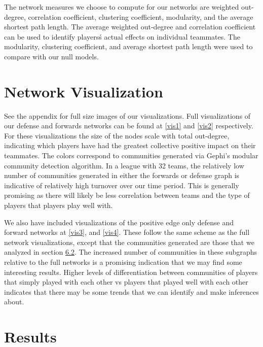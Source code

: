 \documentclass{article}
\begin{document}
The network measures we choose to compute for our networks are weighted out-degree,  correlation coefficient, clustering coefficient, modularity, and the average shortest path length. The average weighted out-degree and correlation coefficient can be used to identify players\'s actual effects on individual teammates. The modularity, clustering coefficient, and average shortest path length  were used to compare with our null models. 


\section{Network Visualization}
See the appendix for full size images of our visualizations.
Full visualizations of our defense and forwards networks can be found at \ref{vis1} and \ref{vis2} respectively.
For these visualizations the size of the nodes scale with total out-degree, indicating which players have had the greatest collective positive impact on their teammates.
The colors correspond to communities generated via Gephi's modular community detection algorithm.
In a league with 32 teams, the relatively low number of communities generated in either the forwards or defense graph is indicative of relatively high turnover over our time period.
This is generally promising as there will likely be less correlation between teams and the type of players that players play well with.

We also have included visualizations of the positive edge only defense and forward networks at \ref{vis3}, and \ref{vis4}.
These follow the same scheme as the full network visualizations, except that the communities generated are those that we analyzed in section \hyperref[sec:community]{6.2}.
The increased number of communities in these subgraphs relative to the full networks is a promising indication that we may find some interesting results.
Higher levels of differentiation between communities of players that simply played with each other vs players that played well with each other indicates that there may be some trends that we can identify and make inferences about.

\section{Results}
\end{document}
